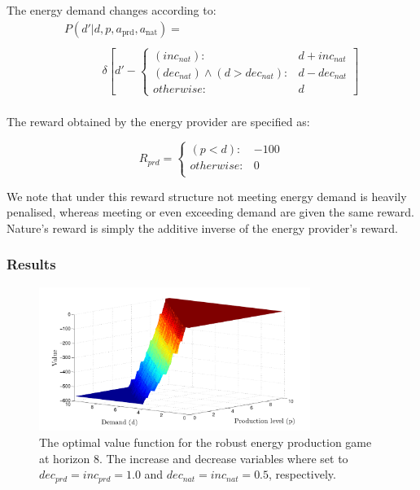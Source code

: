 The energy demand changes according to:
{\small 
\abovedisplayskip=15pt
\belowdisplayskip=0pt
\begin{align*}
&P(d' | d, p, a_{\text{prd}}, a_{\text{nat}}) = \\
\\
& \hspace{40pt}\delta \left[ d' - \begin{cases}
      (inc_{nat})  : & d + inc_{nat} \\
       (dec_{nat}) \wedge (d > dec_{nat}) : & d - dec_{nat} \\
      otherwise: & d
    \end{cases} \right] & \\    
\end{align*}
}%

The reward obtained by the energy provider are specified as:

\vspace{-1.5mm}
{\small 
\abovedisplayshortskip=0pt
\belowdisplayshortskip=0pt
\begin{equation}
  R_{prd} = 
    \begin{cases}
      (p < d) : & -100 \\ 
      otherwise : & 0 \\ 
    \end{cases} \nonumber
\end{equation}
}%

We note that under this reward structure not meeting energy demand
is heavily penalised, whereas meeting or even exceeding demand are
given the same reward. Nature's reward is simply the additive inverse 
of the energy provider's reward.

\subsubsection{Results}


\begin{figure}[ht!]
\includegraphics[width=250pt]{sep.pdf}
\vspace{-3mm}
\caption{The optimal value function for the robust energy production game at horizon 8. 
The increase and decrease variables where set to $dec_{prd} = inc_{prd} = 1.0$ and $dec_{nat} = inc_{nat} = 0.5$, respectively.}
\label{fig:sepvfunc}
\end{figure}

